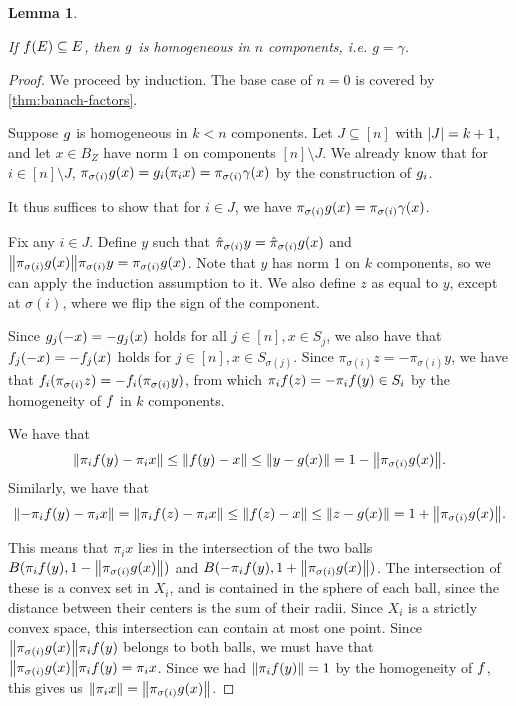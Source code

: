 \documentclass{amsart}
\newtheorem{lemma}{Lemma}[section]
\theoremstyle{definition}
\begin{document}
\begin{lemma} \label{lem:g-homogeneous}

  \annotation
  If $f(E) \subseteq E$, then $g$ is homogeneous in $n$ components, i.e. $g = \gamma$.
\end{lemma}
\begin{proof} 

  We proceed by induction. The base case of $n=0$ is covered by \autoref{thm:banach-factors}.

  Suppose $g$ is homogeneous in $k < n$ components. Let $J \subseteq [n]$ with
  $\abs{J} = k+1$, and let $x \in B_Z$ have norm 1 on components $[n] \setminus J$. We
  already know that for $i \in [n]\setminus J$, $\pi_{\sigma(i)} g(x) = g_i (\pi_i x)
  = \pi_{\sigma(i)} \gamma (x)$ by
  the construction of $g_i$.

  It thus suffices to show that for $i \in J$, we have $\pi_{\sigma(i)} g(x) =
  \pi_{\sigma(i)} \gamma(x)$.

	Fix any $i \in J$. Define $y$ such that $\hat{\pi}_{\sigma(i)} y = \hat{\pi}_{\sigma(i)} g(x)$ and $\norm{\pi_{\sigma(i)} g(x)} \pi_{\sigma(i)} y = \pi_{\sigma(i)} g(x)$. Note that
	$y$ has norm 1 on $k$ components, so we can apply the induction assumption to it.
	We also define $z$ as equal to $y$, except at $\sigma(i)$, where we flip the
	sign of the component.



	Since $g_j (-x) = -g_j (x)$ holds for all $j \in [n], x \in S_j$, we also have that
	$f_j (-x) = -f_j (x)$ holds for
	$j \in [n], x \in S_{\sigma(j)}$. Since $\pi_{\sigma(i)} z = -\pi_{\sigma(i)} y$, we have that
  $f_i (\pi_{\sigma(i)} z) = -f_i (\pi_{\sigma(i)} y)$, from which
  $\pi_i f(z) = -\pi_i f(y) \in S_i$ by the homogeneity of $f$ in $k$ components.

  We have that
  \[ \norm{\pi_i f(y) - \pi_i x} \leq \norm{f(y) - x} \leq \norm{y - g(x)} = 1 - \norm{\pi_{\sigma(i)} g(x)}. \]
	Similarly, we have that
  \[ \norm{-\pi_i f(y) - \pi_i x} = \norm{\pi_i f(z) - \pi_i x} \leq \norm{f(z) - x} \leq \norm{z - g(x)} = 1 + \norm{\pi_{\sigma(i)} g(x)}. \]


  This means that $\pi_i x$ lies in the
	intersection of the two balls $B(\pi_i f(y), 1-\norm{\pi_{\sigma(i)} g(x)})$ and
	$B(-\pi_i f(y), 1+\norm{\pi_{\sigma(i)} g(x)})$. The intersection of these is a convex
	set in $X_i$, and is contained in the sphere of each ball, since the distance between their centers is the sum of their radii. Since $X_i$ is a strictly
	convex space, this intersection can contain at most one point. Since
  $\norm{\pi_{\sigma(i)} g(x)}\pi_i f(y)$ belongs to both balls, we must have that
	$\norm{\pi_{\sigma(i)} g(x)}\pi_i f(y) = \pi_i x$. Since we had $\norm{\pi_i f(y)}=1$
	by the homogeneity of $f$, this gives us
  $\norm{\pi_i x} = \norm{\pi_{\sigma(i)} g(x)}$.


\end{proof}
\end{document}
